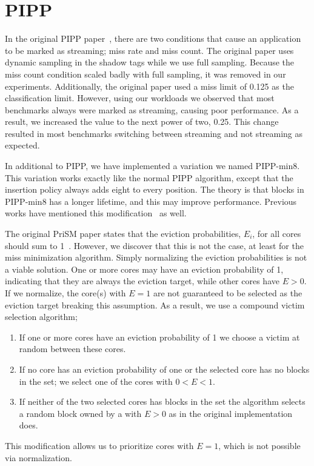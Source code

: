 \section{PIPP}

In the original PIPP paper~\cite{Xie2009}, there are two conditions that cause an application to be marked as streaming; miss rate and miss count.
The original paper uses dynamic sampling in the shadow tags while we use full sampling.
Because the miss count condition scaled badly with full sampling, it was removed in our experiments.
Additionally, the original paper used a miss limit of 0.125 as the classification limit.
However, using our workloads we observed that most benchmarks always were marked as streaming, causing poor performance.
As a result, we increased the value to the next power of two, 0.25.
This change resulted in most benchmarks switching between streaming and not streaming as expected.

In additional to PIPP, we have implemented a variation we named PIPP-min8.
This variation works exactly like the normal PIPP algorithm, except that the insertion policy always adds eight to every position.
The theory is that blocks in PIPP-min8 has a longer lifetime, and this may improve performance.
Previous works have mentioned this modification~\cite{Manikantan2012} as well.

The original PriSM paper states that the eviction probabilities, $E_i$, for all cores should sum to 1~\cite{Manikantan2012}.
However, we discover that this is not the case, at least for the miss minimization algorithm.
Simply normalizing the eviction probabilities is not a viable solution.
One or more cores may have an eviction probability of 1, indicating that they are always the eviction target, while other cores have $E > 0$.
If we normalize, the core(s) with $E=1$ are not guaranteed to be selected as the eviction target breaking this assumption.
As a result, we use a compound victim selection algorithm;
\begin{enumerate}
\item If one or more cores have an eviction probability of 1 we choose a victim at random between these cores.
\item If no core has an eviction probability of one or the selected core has no blocks in the set; we select one of the cores with $0 < E < 1$.
\item If neither of the two selected cores has blocks in the set the algorithm selects a random block owned by a with $E > 0$ as in the original implementation does.
\end{enumerate}
This modification allows us to prioritize cores with $E = 1$, which is not possible via normalization.